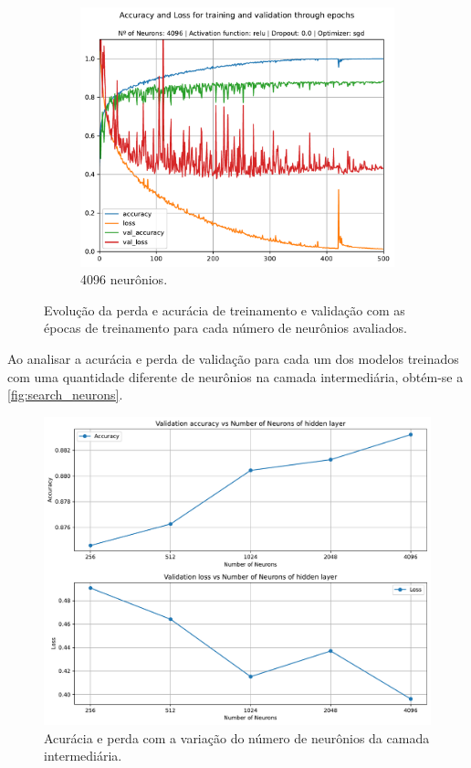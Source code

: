 \begin{figure}[H]
\begin{subfigure}[H]{0.49\textwidth}
	\end{subfigure}
	\begin{subfigure}[H]{0.49\textwidth}
		\centering
		\includegraphics[width = \textwidth]{../../plot/mlp/mlp_4096_relu_0.0_sgd}
		\caption{4096 neurônios.}
		\label{fig:mlp_4096_relu_0.0_sgd}
	\end{subfigure}
	\caption{Evolução da perda e acurácia de treinamento e validação com as épocas de treinamento para cada número de neurônios avaliados.}
	\label{fig:search_neurons_training}
\end{figure}

Ao analisar a acurácia e perda de validação para cada um dos modelos treinados com uma quantidade diferente de neurônios na camada intermediária, obtém-se a \autoref{fig:search_neurons}.


\begin{figure}[H]
	\centering
	\includegraphics[width=0.75\linewidth]{../../plot/mlp/search_neurons}
	\caption{Acurácia e perda com a variação do número de neurônios da camada intermediária.}
	\label{fig:search_neurons}
\end{figure}

